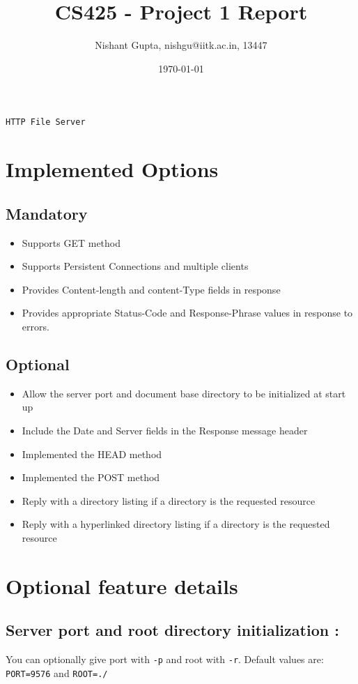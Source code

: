 \documentclass[11pt]{article}
\author{Nishant Gupta, nishgu@iitk.ac.in, 13447}
\date{\today}
\title{CS425 - Project 1 Report}
\begin{document}
\maketitle
\begin{center}
\texttt{\Huge HTTP File Server}
\end{center}

\section{Implemented Options}
\label{sec:orgheadline3}
\subsection{Mandatory}
\label{sec:orgheadline1}
\begin{itemize}
\item Supports GET method
\item Supports Persistent Connections and multiple clients
\item Provides Content-length and content-Type fields in response
\item Provides appropriate Status-Code and Response-Phrase values in response to errors.
\end{itemize}
\subsection{Optional}
\label{sec:orgheadline2}
\begin{itemize}
\item Allow the server port and document base directory to be initialized at start up
\item Include the Date and Server fields in the Response message header
\item Implemented the HEAD method
\item Implemented the POST method
\item Reply with a directory listing if a directory is the requested resource
\item Reply with a hyperlinked directory listing if a directory is the requested resource
\end{itemize}

\newpage
\section{Optional feature details}
\label{sec:orgheadline9}
\subsection{Server port and root directory initialization :}
\label{sec:orgheadline4}
You can optionally give port with \texttt{-p} and root with \texttt{-r}.
Default values are: \texttt{PORT=9576} and \texttt{ROOT=./}
\end{document}
